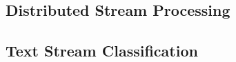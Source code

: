 \label {fs-short-bgr}

\subsection{Distributed Stream Processing}

\subsection{Text Stream Classification}
